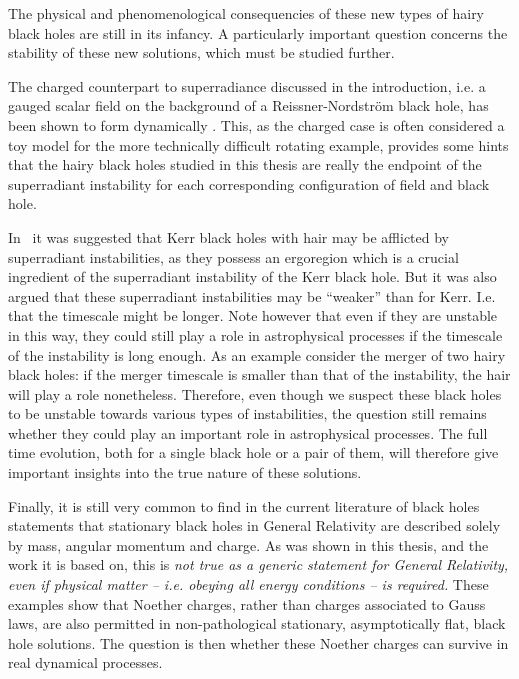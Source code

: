 \bigskip

The physical and phenomenological consequencies of these new types of hairy black holes are still in its infancy.
A particularly important question concerns the stability of these new solutions, which must be studied further.

The charged counterpart to superradiance discussed in the introduction, i.e. a gauged scalar field on the background of a Reissner-Nordström black hole, has been shown to form dynamically \cite{Sanchis-Gual:2015lje}.
This, as the charged case is often considered a toy model for the more technically difficult rotating example, provides some hints that the hairy black holes studied in this thesis are really the endpoint of the superradiant instability for each corresponding configuration of field and black hole.

In~\cite{Herdeiro:2014jaa} it was suggested that Kerr black holes with hair may be afflicted by superradiant instabilities, as they possess an ergoregion which is a crucial ingredient of the superradiant instability of the Kerr black hole.
But it was also argued that these superradiant instabilities may be ``weaker''  than for Kerr.
I.e. that the timescale might be longer.
Note however that even if they are unstable in this way, they could still play a role in astrophysical processes if the timescale of the instability is long enough.
As an example consider the merger of two hairy black holes: if the merger timescale is smaller than that of the instability, the hair will play a role nonetheless.
Therefore, even though we suspect these black holes to be unstable towards various types of instabilities, the question still remains whether they could play an important role in astrophysical processes.
The full time evolution, both for a single black hole or a pair of them, will therefore give important insights into the true nature of these solutions.


\bigskip

Finally, it is still very common to find in the current literature of black holes statements that stationary black holes in General Relativity are described solely by mass, angular momentum and charge.
As was shown in this thesis, and the work it is based on, this is \textit{not true as a generic statement for General Relativity, even if physical matter -- i.e. obeying all energy conditions -- is required.}
These examples show that Noether charges, rather than charges associated to Gauss laws, are also permitted in non-pathological stationary, asymptotically flat, black hole solutions. 
The question is then whether these Noether charges can survive in real dynamical processes.

